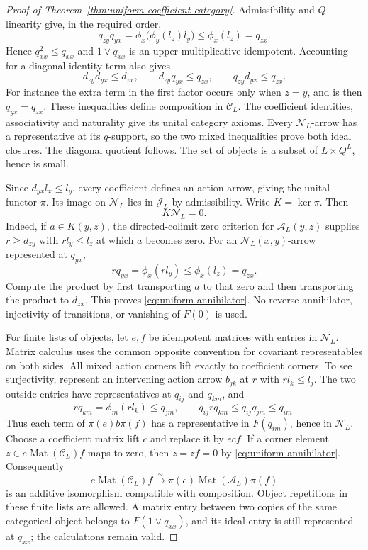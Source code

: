 \begin{proof}[Proof of Theorem~\ref{thm:uniform-coefficient-category}]
Admissibility and $Q$-linearity give, in the required order,
\[
 q_{zy}q_{yx}
 =\phi_x\bigl(\phi_y(l_z)l_y\bigr)
 \leq\phi_x(l_z)=q_{zx}.
\]
Hence $q_{xx}^2\leq q_{xx}$ and $1\vee q_{xx}$ is an upper
multiplicative idempotent. Accounting for a diagonal identity
term also gives
\[
 d_{zy}d_{yx}\leq d_{zx},\qquad
 d_{zy}q_{yx}\leq q_{zx},\qquad
 q_{zy}d_{yx}\leq q_{zx}.
\]
For instance the extra term in the first factor occurs only
when $z=y$, and is then $q_{yx}=q_{zx}$.
These inequalities define composition in $\mathcal C_L$.
The coefficient identities, associativity and naturality give
its unital category axioms. Every $\mathcal N_L$-arrow has a
representative at its $q$-support, so the two mixed inequalities
prove both ideal closures. The diagonal quotient follows.
The set of objects is a subset of $L\times Q^L$, hence is small.

Since $d_{yx}l_x\leq l_y$, every coefficient defines an action
arrow, giving the unital functor $\pi$. Its image on
$\mathcal N_L$ lies in $\mathcal J_L$ by admissibility.
Write $K=\ker\pi$. Then
\begin{equation}\label{eq:uniform-annihilator}
 K\mathcal N_L=0.
\end{equation}
Indeed, if $a\in K(y,z)$, the directed-colimit zero criterion
for $\mathcal A_L(y,z)$ supplies $r\geq d_{zy}$ with
$rl_y\leq l_z$ at which $a$ becomes zero. For an
$\mathcal N_L(x,y)$-arrow represented at $q_{yx}$,
\[
 rq_{yx}=\phi_x(rl_y)\leq\phi_x(l_z)=q_{zx}.
\]
Compute the product by first transporting $a$ to that zero
and then transporting the product to $d_{zx}$. This proves
\eqref{eq:uniform-annihilator}. No reverse annihilator,
injectivity of transitions, or vanishing of $F(0)$ is used.

For finite lists of objects, let $e,f$ be idempotent matrices
with entries in $\mathcal N_L$. Matrix calculus uses the common
opposite convention for covariant representables on both sides.
All mixed action corners
lift exactly to coefficient corners. To see surjectivity,
represent an intervening action arrow $b_{jk}$ at $r$ with
$rl_k\leq l_j$. The two outside entries have representatives
at $q_{ij}$ and $q_{km}$, and
\[
 rq_{km}=\phi_m(rl_k)\leq q_{jm},\qquad
 q_{ij}rq_{km}\leq q_{ij}q_{jm}\leq q_{im}.
\]
Thus each term of $\pi(e)b\pi(f)$ has a representative in
$F(q_{im})$, hence in $\mathcal N_L$. Choose a coefficient
matrix lift $c$ and replace it by $ecf$. If a corner element
$z\in e\operatorname{Mat}(\mathcal C_L)f$ maps to zero,
then $z=zf=0$ by \eqref{eq:uniform-annihilator}.
Consequently
\[
 e\operatorname{Mat}(\mathcal C_L)f
 \xrightarrow{\sim}
 \pi(e)\operatorname{Mat}(\mathcal A_L)\pi(f)
\]
is an additive isomorphism compatible with composition.
Object repetitions in these finite lists are allowed.
A matrix entry between two copies of the same categorical
object belongs to $F(1\vee q_{xx})$, and its ideal entry is
still represented at $q_{xx}$; the calculations remain valid.


\end{proof}
